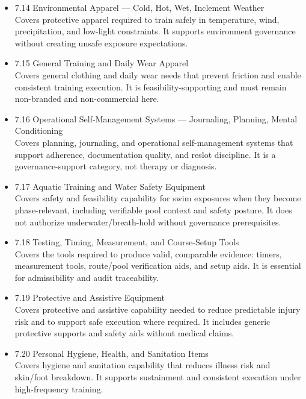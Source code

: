 \documentclass[10pt]{article}
\begin{document}
\begin{itemize}
\item 7.14 Environmental Apparel — Cold, Hot, Wet, Inclement Weather\\
Covers protective apparel required to train safely in temperature, wind, precipitation, and low-light constraints. It supports environment governance without creating unsafe exposure expectations.

\item 7.15 General Training and Daily Wear Apparel\\
Covers general clothing and daily wear needs that prevent friction and enable consistent training execution. It is feasibility-supporting and must remain non-branded and non-commercial here.

\item 7.16 Operational Self-Management Systems — Journaling, Planning, Mental Conditioning\\
Covers planning, journaling, and operational self-management systems that support adherence, documentation quality, and reslot discipline. It is a governance-support category, not therapy or diagnosis.

\item 7.17 Aquatic Training and Water Safety Equipment\\
Covers safety and feasibility capability for swim exposures when they become phase-relevant, including verifiable pool context and safety posture. It does not authorize underwater/breath-hold without governance prerequisites.

\item 7.18 Testing, Timing, Measurement, and Course-Setup Tools\\
Covers the tools required to produce valid, comparable evidence: timers, measurement tools, route/pool verification aids, and setup aids. It is essential for admissibility and audit traceability.

\item 7.19 Protective and Assistive Equipment\\
Covers protective and assistive capability needed to reduce predictable injury risk and to support safe execution where required. It includes generic protective supports and safety aids without medical claims.

\item 7.20 Personal Hygiene, Health, and Sanitation Items\\
Covers hygiene and sanitation capability that reduces illness risk and skin/foot breakdown. It supports sustainment and consistent execution under high-frequency training.
\end{itemize}
\end{document}
